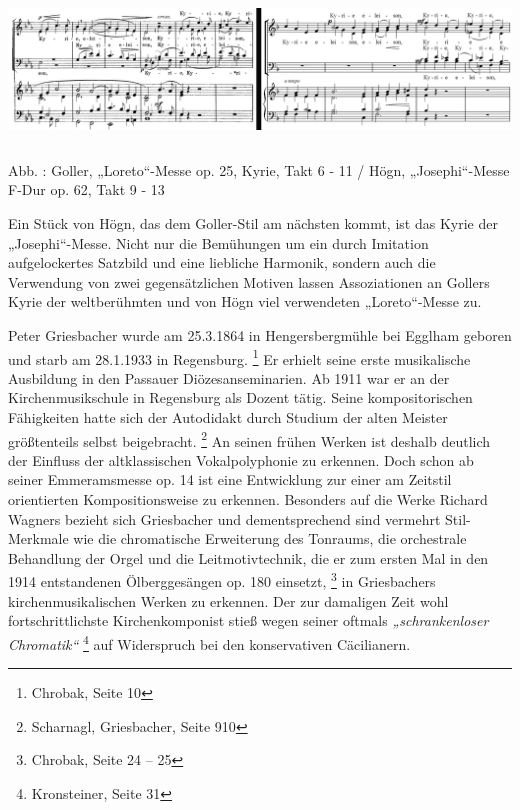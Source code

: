 \documentclass[a4paper]{article}
\newcounter{Abb}
\renewcommand\theAbb{\arabic{Abb}}
\begin{document}
\includegraphics[width=15.977cm,height=3.87cm]{pictures/zulassungsarbeit-img090.png}


Abb. \stepcounter{Abb}{\theAbb}: Goller, „Loreto“-Messe op. 25, Kyrie,
Takt 6 - 11 / Högn, „Josephi“-Messe F-Dur op. 62, Takt 9 - 13

Ein Stück von Högn, das dem Goller-Stil am nächsten kommt, ist das Kyrie
der „Josephi“-Messe. Nicht nur die Bemühungen um ein durch Imitation
aufgelockertes Satzbild und eine liebliche Harmonik, sondern auch die
Verwendung von zwei gegensätzlichen Motiven lassen Assoziationen an
Gollers Kyrie der weltberühmten und von Högn viel verwendeten
„Loreto“-Messe zu.

Peter Griesbacher wurde am 25.3.1864 in Hengersbergmühle bei Egglham
geboren und starb am 28.1.1933 in Regensburg. \footnote{Chrobak, Seite
10} Er erhielt seine erste musikalische Ausbildung in den Passauer
Diözesanseminarien. Ab 1911 war er an der Kirchenmusikschule in
Regensburg als Dozent tätig. Seine kompositorischen Fähigkeiten hatte
sich der Autodidakt durch Studium der alten Meister größtenteils selbst
beigebracht. \footnote{Scharnagl, Griesbacher, Seite 910} An seinen
frühen Werken ist deshalb deutlich der Einfluss der altklassischen
Vokalpolyphonie zu erkennen. Doch schon ab seiner Emmeramsmesse op. 14
ist eine Entwicklung zur einer am Zeitstil orientierten
Kompositionsweise zu erkennen. Besonders auf die Werke Richard Wagners
bezieht sich Griesbacher und dementsprechend sind vermehrt
Stil-Merkmale wie die chromatische Erweiterung des Tonraums, die
orchestrale Behandlung der Orgel und die Leitmotivtechnik, die er zum
ersten Mal in den 1914 entstandenen Ölberggesängen op. 180
einsetzt, \footnote{Chrobak, Seite 24 – 25} in Griesbachers
kirchenmusikalischen Werken zu erkennen. Der zur damaligen Zeit wohl
fortschrittlichste Kirchenkomponist stieß wegen seiner oftmals
\textit{„schrankenloser Chromatik“ } \footnote{Kronsteiner, Seite 31}
auf Widerspruch bei den konservativen Cäcilianern.
\end{document}
